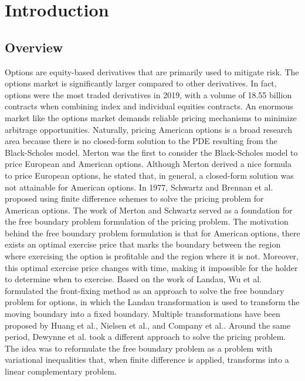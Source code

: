 \section{Introduction}

\subsection{Overview}

Options are equity-based derivatives that are primarily used to mitigate risk. The options market is significantly larger compared to other derivatives. In fact, options were the most traded derivatives in 2019, with a volume of 18.55 billion contracts when combining index and individual equities contracts\cite{statista_2019}. An enormous market like the options market demands reliable pricing mechanisms to minimize arbitrage opportunities. Naturally, pricing American options is a broad research area because there is no closed-form solution to the PDE resulting from the Black-Scholes model. Merton\cite{merton_1973} was the first to consider the Black-Scholes\cite{black_scholes_1973} model to price European and American options. Although Merton derived a nice formula to price European options, he stated that, in general, a closed-form solution was not attainable for American options. In 1977, Schwartz\cite{schwartz_197779} and Brennan et al.\cite{brennan_1997} proposed using finite difference schemes to solve the pricing problem for American options. The work of Merton and Schwartz served as a foundation for the free boundary problem formulation of the pricing problem. The motivation behind the free boundary problem formulation is that for American options, there exists an optimal exercise price that marks the boundary between the region where exercising the option is profitable and the region where it is not. Moreover, this optimal exercise price changes with time, making it impossible for the holder to determine when to exercise. Based on the work of Landau\cite{landau_1950_heat_ci}, Wu et al.\cite{wu1997front} formulated the front-fixing method as an approach to solve the free boundary problem for options, in which the Landau transformation is used to transform the moving boundary into a fixed boundary. Multiple transformations have been proposed by Huang et al.\cite{huang_2000}, Nielsen et al.\cite{nielsen_2001}, and Company et al.\cite{company_egorova_jodar_2014}. Around the same period, Dewynne et al.\cite{dewynne_howison_rupf_wilmott_1993} took a different approach to solve the pricing problem. The idea was to reformulate the free boundary problem as a problem with variational inequalities that, when finite difference is applied, transforms into a linear complementary problem\cite{cottle_1968}.

